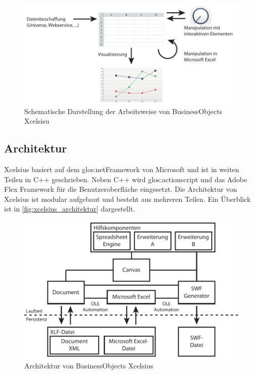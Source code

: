 \begin{onehalfspacing}
\begin{figure}[!ht]
\centering
\setlength{\unitlength}{1mm}
\includegraphics[width=15cm]{images/Abbildung4-Arbeitsweise-Xcelsius.pdf}
\caption{Schematische Darstellung der Arbeitsweise von BusinessObjects Xcelsisu\label{fig:xcelsius_ablauf_schema}}
\end{figure}

\subsection{Architektur}
\gls{Xcelsius} basiert auf dem \gls{glos:netFramework} von Microsoft und ist in weiten Teilen in C++ geschrieben. Neben C++ wird \gls{glos:actionscript} und das Adobe Flex Framework für die  Benutzeroberfläche eingesetzt. Die Architektur von \gls{Xcelsius} ist modular aufgebaut und besteht aus mehreren Teilen. Ein Überblick ist in \vref{fig:xcelsius_architektur} dargestellt.

\begin{figure}[!ht]
\centering
\setlength{\unitlength}{1mm}
\includegraphics[width=15cm]{images/Abbildung5-Architektur-Xcelsius.pdf}
\caption{Architektur von BusinessObjects Xcelsius\label{fig:xcelsius_architektur}}
\end{figure}


\end{onehalfspacing}
